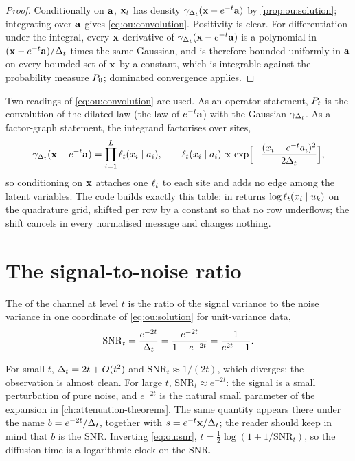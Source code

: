 \begin{proof}
Conditionally on $\mathbf{a}$, $\mathbf{x}_t$ has density $\gamma_{\Delta_t}(\mathbf{x}-e^{-t}\mathbf{a})$ by
\cref{prop:ou:solution}; integrating over $\mathbf{a}$ gives \cref{eq:ou:convolution}.
Positivity is clear. For differentiation under the integral, every $\mathbf{x}$-derivative of
$\gamma_{\Delta_t}(\mathbf{x}-e^{-t}\mathbf{a})$ is a polynomial in $(\mathbf{x}-e^{-t}\mathbf{a})/\Delta_t$ times the same
Gaussian, and is therefore bounded uniformly in $\mathbf{a}$ on every bounded set of $\mathbf{x}$ by a
constant, which is integrable against the probability measure $P_0$; dominated
convergence applies.
\end{proof}

Two readings of \cref{eq:ou:convolution} are used. As an operator statement,
$P_t$ is the convolution of the dilated law (the law of $e^{-t}\mathbf{a}$) with the Gaussian
$\gamma_{\Delta_t}$. As a factor-graph statement, the integrand factorises over sites,
\begin{equation}
  \gamma_{\Delta_t}(\mathbf{x}-e^{-t}\mathbf{a})=\prod_{i=1}^{L}\ell_t(x_i\mid a_i),\qquad
  \ell_t(x_i\mid a_i)\propto\exp\Bigl[-\frac{(x_i-e^{-t}a_i)^2}{2\Delta_t}\Bigr],
  \label{eq:ou:unary}
\end{equation}
so conditioning on $\mathbf{x}$ attaches one  $\ell_t$ to each
site and adds no edge among the latent variables. The code builds exactly this table:
 in  returns
$\log\ell_t(x_i\mid u_{k})$ on the quadrature grid, shifted per row by a constant
so that no row underflows; the shift cancels in every normalised message and changes
nothing.

\section{The signal-to-noise ratio}
\label{sec:ou:snr}

\begin{definition}
\label{def:ou:snr}
The  of the channel at level $t$ is the ratio of the
signal variance to the noise variance in one coordinate of \cref{eq:ou:solution} for
unit-variance data,
\begin{equation}
  \mathrm{SNR}_t=\frac{e^{-2t}}{\Delta_t}=\frac{e^{-2t}}{1-e^{-2t}}=\frac{1}{e^{2t}-1}.
  \label{eq:ou:snr}
\end{equation}
\end{definition}

For small $t$, $\Delta_t=2t+O(t^2)$ and $\mathrm{SNR}_t\approx1/(2t)$, which diverges: the
observation is almost clean. For large $t$, $\mathrm{SNR}_t\approx e^{-2t}$: the signal
is a small perturbation of pure noise, and $e^{-2t}$ is the natural small parameter of
the expansion in \cref{ch:attenuation-theorems}. The same quantity appears there under
the name $b=e^{-2t}/\Delta_t$, together with $s=e^{-t}\mathbf{x}/\Delta_t$; the reader should keep in
mind that $b$ is the SNR. Inverting \cref{eq:ou:snr}, $t=\tfrac12\log(1+1/\mathrm{SNR}_t)$,
so the diffusion time is a logarithmic clock on the SNR.


